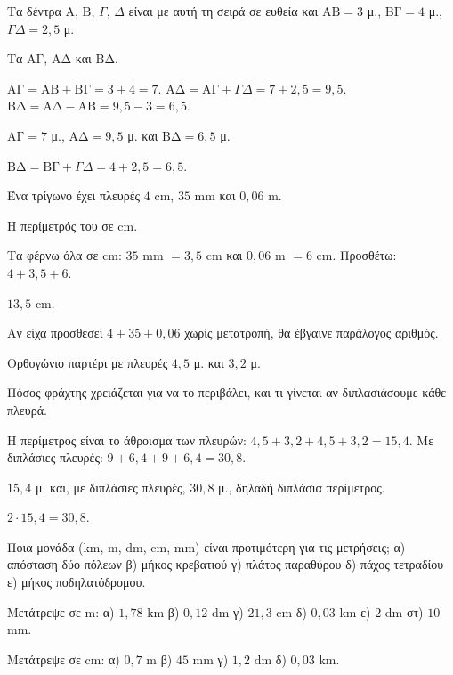 \tixero Τα δέντρα $\mathrm{Α},\,\mathrm{Β},\,\Gamma,\,\Delta$ είναι με αυτή τη σειρά σε ευθεία και $\mathrm{ΑΒ}=3$ μ., $\mathrm{ΒΓ}=4$ μ., $\Gamma\Delta=2{,}5$ μ.\par
\tithelo Τα $\mathrm{ΑΓ}$, $\mathrm{ΑΔ}$ και $\mathrm{ΒΔ}$.\par
\possindeo $\mathrm{ΑΓ}=\mathrm{ΑΒ}+\mathrm{ΒΓ}=3+4=7$. $\mathrm{ΑΔ}=\mathrm{ΑΓ}+\Gamma\Delta=7+2{,}5=9{,}5$. $\mathrm{ΒΔ}=\mathrm{ΑΔ}-\mathrm{ΑΒ}=9{,}5-3=6{,}5$.\par
\apantisi $\mathrm{ΑΓ}=7$ μ., $\mathrm{ΑΔ}=9{,}5$ μ. και $\mathrm{ΒΔ}=6{,}5$ μ.\par
\elegxos $\mathrm{ΒΔ}=\mathrm{ΒΓ}+\Gamma\Delta=4+2{,}5=6{,}5$.

\tixero Ένα τρίγωνο έχει πλευρές $4$ cm, $35$ mm και $0{,}06$ m.\par
\tithelo Η περίμετρός του σε cm.\par
\possindeo Τα φέρνω όλα σε cm: $35$ mm $=3{,}5$ cm και $0{,}06$ m $=6$ cm. Προσθέτω: $4+3{,}5+6$.\par
\apantisi $13{,}5$ cm.\par
\elegxos Αν είχα προσθέσει $4+35+0{,}06$ χωρίς μετατροπή, θα έβγαινε παράλογος αριθμός.

\tixero Ορθογώνιο παρτέρι με πλευρές $4{,}5$ μ. και $3{,}2$ μ.\par
\tithelo Πόσος φράχτης χρειάζεται για να το περιβάλει, και τι γίνεται αν διπλασιάσουμε κάθε πλευρά.\par
\possindeo Η περίμετρος είναι το άθροισμα των πλευρών: $4{,}5+3{,}2+4{,}5+3{,}2=15{,}4$. Με διπλάσιες πλευρές: $9+6{,}4+9+6{,}4=30{,}8$.\par
\apantisi $15{,}4$ μ. και, με διπλάσιες πλευρές, $30{,}8$ μ., δηλαδή διπλάσια περίμετρος.\par
\elegxos $2\cdot15{,}4=30{,}8$.



\ex Ποια μονάδα (km, m, dm, cm, mm) είναι προτιμότερη για τις μετρήσεις; α) απόσταση δύο πόλεων \quad β) μήκος κρεβατιού \quad γ) πλάτος παραθύρου \quad δ) πάχος τετραδίου \quad ε) μήκος ποδηλατόδρομου.

\ex Μετάτρεψε σε m: α) $1{,}78$ km \quad β) $0{,}12$ dm \quad γ) $21{,}3$ cm \quad δ) $0{,}03$ km \quad ε) $2$ dm \quad στ) $10$ mm.

\ex Μετάτρεψε σε cm: α) $0{,}7$ m \quad β) $45$ mm \quad γ) $1{,}2$ dm \quad δ) $0{,}03$ km.

